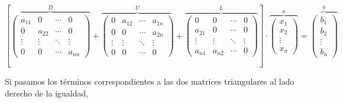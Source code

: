 \begin{equation*}
\left[\overbrace{\begin{pmatrix}
a_{11}& 0& \cdots & 0\\
0& a_{22}& \cdots & 0\\
\vdots & \vdots & \ddots & \vdots\\
0& 0& \cdots & a_{nn}
\end{pmatrix}}^D+
\overbrace{\begin{pmatrix}
0& a_{12}& \cdots & a_{1n}\\
0& 0& \cdots & a_{2n}\\
\vdots & \vdots & \ddots & \vdots\\
0& 0& \cdots & 0
\end{pmatrix}}^U + \overbrace{\begin{pmatrix}
0& 0& \cdots & 0\\
a_{21}& 0& \cdots & 0\\
\vdots & \vdots & \ddots & \vdots\\
a_{n1}& a_{n2}& \cdots & 0
\end{pmatrix}}^L \right]\cdot \overbrace{\begin{pmatrix}
x_1\\
x_2\\
\vdots \\
x_n
\end{pmatrix}}^x=\overbrace{\begin{pmatrix}
b_1\\
b_2\\
\vdots \\
b_n
\end{pmatrix}}^b
\end{equation*}

Si pasamos los términos correspondientes a las dos matrices triangulares al lado derecho de la igualdad,

